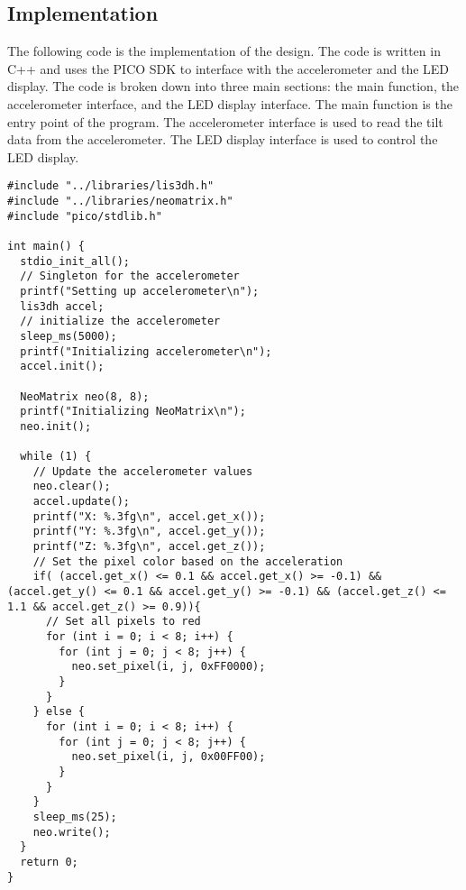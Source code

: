 \documentclass{article}
\begin{document}
\subsection*{Implementation}
The following code is the implementation of the design. The code is written in C++ and uses the PICO SDK to interface with the accelerometer and the LED display. The code is broken down into three main sections: the main function, the accelerometer interface, and the LED display interface. The main function is the entry point of the program. The accelerometer interface is used to read the tilt data from the accelerometer. The LED display interface is used to control the LED display.

\begin{lstlisting}[style=cpp, caption={Main Function}]
  #include "../libraries/lis3dh.h"
#include "../libraries/neomatrix.h"
#include "pico/stdlib.h"

int main() {
  stdio_init_all();
  // Singleton for the accelerometer
  printf("Setting up accelerometer\n");
  lis3dh accel;
  // initialize the accelerometer
  sleep_ms(5000);
  printf("Initializing accelerometer\n");
  accel.init();

  NeoMatrix neo(8, 8);
  printf("Initializing NeoMatrix\n");
  neo.init();
  
  while (1) {
    // Update the accelerometer values
    neo.clear();
    accel.update();
    printf("X: %.3fg\n", accel.get_x());
    printf("Y: %.3fg\n", accel.get_y());
    printf("Z: %.3fg\n", accel.get_z());
    // Set the pixel color based on the acceleration
    if( (accel.get_x() <= 0.1 && accel.get_x() >= -0.1) && (accel.get_y() <= 0.1 && accel.get_y() >= -0.1) && (accel.get_z() <= 1.1 && accel.get_z() >= 0.9)){
      // Set all pixels to red
      for (int i = 0; i < 8; i++) {
        for (int j = 0; j < 8; j++) {
          neo.set_pixel(i, j, 0xFF0000);
        }
      }
    } else {
      for (int i = 0; i < 8; i++) {
        for (int j = 0; j < 8; j++) {
          neo.set_pixel(i, j, 0x00FF00);
        }
      }
    }
    sleep_ms(25);
    neo.write();
  }
  return 0;
}
\end{lstlisting}
\end{document}
